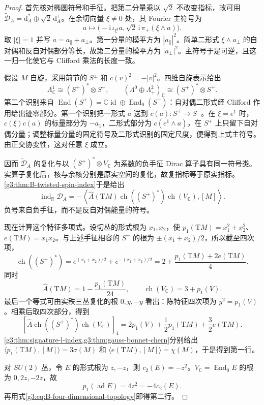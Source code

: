 \begin{proof}
 首先核对椭圆符号和手征。把第二分量乘以 \(\sqrt2\) 不改变指标，故可用
 \(\widetilde{\mathcal D}_A=\mathrm d_A^*\oplus\sqrt2\,\mathrm d_A^+\)。在余切向量 \(\xi\ne0\) 处，其 Fourier 主符号为
 \[
 a\longmapsto
 \bigl(-\mathrm i\,\iota_{\xi^\sharp}a,
       \sqrt2\,\mathrm i\,\pi_+(\xi\wedge a)\bigr).
 \]
 取 \(|\xi|=1\) 并写 \(a=a_\parallel+a_\perp\)。第一分量的模平方为 \(|a_\parallel|^2\)。简单二形式 \(\xi\wedge a_\perp\) 的自对偶和反自对偶部分等长，故第二分量的模平方为 \(|a_\perp|^2\)。主符号于是可逆，且这一归一化使它与 Clifford 乘法的长度一致。

 假设 \(M\) 自旋，采用前节的 \(S^\pm\) 和 \(c(v)^2=-|v|^2\)。四维自旋表示给出
 \[
 \Lambda^1_{\mathbb C}\cong(S^+)^*\otimes S^- ,\qquad
 (\Lambda^0\oplus\Lambda^2_+)_{\mathbb C}
       \cong(S^+)^*\otimes S^+.
 \]
 第二个识别来自 \(\operatorname{End}(S^+)=\mathbb C\operatorname{id}\oplus
 \operatorname{End}_0(S^+)\)：自对偶二形式经 Clifford 作用给出迹零部分。第一个识别把一形式 \(a\) 送到 \(c(a):S^+\to S^-\)。在 \(\xi=e^1\) 时，\(c(\xi)c(a)\) 的标量部分为 \(-a_1\)，二形式部分为 \(c(e^1\wedge a)\)，在 \(S^+\) 上只留下自对偶分量；调整标量分量的固定符号及二形式识别的固定尺度，便得到上式主符号。由正交协变性，这对任意 \(\xi\) 成立。

 因而 \(\widetilde{\mathcal D}_A\) 的复化与以
 \((S^+)^*\otimes V_{\mathbb C}\) 为系数的负手征 Dirac 算子具有同一符号类。实算子复化后，核与余核分别是原实空间的复化，故复指标等于原实指标。\cref{g3:thm:B-twisted-spin-index}于是给出
 \begin{equation}\label{g3:eq:B-asd-index-character}
 \operatorname{ind}_{\mathbb R}\mathcal D_A
 =-\left\langle\widehat A(\mathrm TM)
       \operatorname{ch}((S^+)^*)\operatorname{ch}(V_{\mathbb C}),[M]\right\rangle.
 \end{equation}
 负号来自负手征，而不是反自对偶能量的符号。

 现在计算这个特征多项式。设切丛的形式根为 \(x_1,x_2\)，使
 \(p_1(\mathrm TM)=x_1^2+x_2^2\)、\(e(\mathrm TM)=x_1x_2\)。与上述手征相容的 \(S^+\) 的根为
 \(\pm(x_1+x_2)/2\)，所以截至四次项，
 \[
 \operatorname{ch}((S^+)^*)
 =e^{(x_1+x_2)/2}+e^{-(x_1+x_2)/2}
 =2+\frac{p_1(\mathrm TM)+2e(\mathrm TM)}4.
 \]
 同时
 \[
 \widehat A(\mathrm TM)=1-\frac{p_1(\mathrm TM)}{24},\qquad
 \operatorname{ch}(V_{\mathbb C})=3+p_1(V).
 \]
 最后一个等式可由实秩三丛复化的根 \(0,y,-y\) 看出：陈特征四次项为 \(y^2=p_1(V)\)。相乘后取四次部分，得到
 \[
 \left[\widehat A\operatorname{ch}((S^+)^*)\operatorname{ch}(V_{\mathbb C})\right]_4
 =2p_1(V)+\frac12p_1(\mathrm TM)+\frac32e(\mathrm TM).
 \]
 \cref{g3:thm:signature-l-index,g3:thm:gauss-bonnet-chern}分别给出
 \(\langle p_1(\mathrm TM),[M]\rangle=3\sigma(M)\) 和
 \(\langle e(\mathrm TM),[M]\rangle=\chi(M)\)，于是得到第一行。

 对 \(SU(2)\) 丛，令 \(E\) 的形式根为 \(z,-z\)，则
 \(c_2(E)=-z^2\)。\(V_{\mathbb C}=\operatorname{End}_0E\) 的根为 \(0,2z,-2z\)，故
 \begin{equation}\label{g3:eq:B-adjoint-pone}
 p_1(\operatorname{ad}E)=4z^2=-4c_2(E).
 \end{equation}
 再用式\eqref{g3:eq:B-four-dimensional-topology}即得第二行。
\end{proof}

